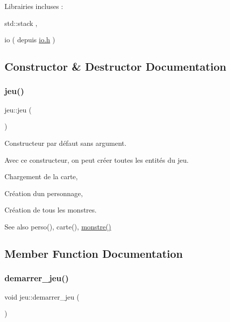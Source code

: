 Librairies incluses \+:
\begin{DoxyItemize}
\item std\+::stack ,
\item io ( depuis \hyperlink{io_8h_source}{io.\+h} ) 
\end{DoxyItemize}

\subsection{Constructor \& Destructor Documentation}
\mbox{\label{classjeu_a38513a7bfd0a7ea4e3a5612da2856016}} 
\subsubsection{\texorpdfstring{jeu()}{jeu()}}
{\footnotesize\ttfamily jeu\+::jeu (\begin{DoxyParamCaption}{ }\end{DoxyParamCaption})}



Constructeur par défaut sans argument. 

Avec ce constructeur, on peut créer toutes les entités du jeu.


\begin{DoxyItemize}
\item Chargement de la carte,
\item Création d\textquotesingle{}un personnage,
\item Création de tous les monstres.
\end{DoxyItemize}

\begin{DoxySeeAlso}{See also}
perso(), carte(), \hyperlink{classmonstre}{monstre()} 
\end{DoxySeeAlso}


\subsection{Member Function Documentation}
\mbox{\label{classjeu_aabf11934ce63bc5d71bbd27e1523fc45}} 
\subsubsection{\texorpdfstring{demarrer\+\_\+jeu()}{demarrer\_jeu()}}
{\footnotesize\ttfamily void jeu\+::demarrer\+\_\+jeu (\begin{DoxyParamCaption}{ }\end{DoxyParamCaption})}



